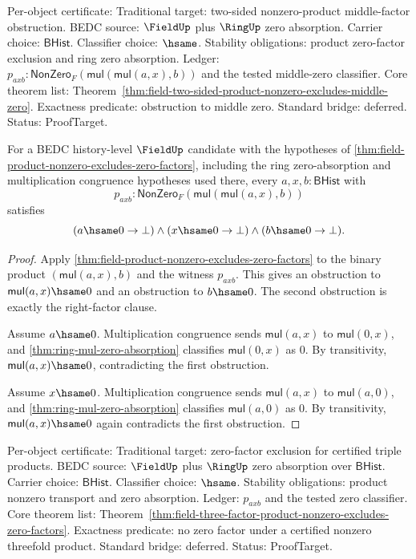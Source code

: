 Per-object certificate: Traditional target: two-sided nonzero-product
middle-factor obstruction. BEDC source: $\FieldUp$ plus $\RingUp$ zero
absorption. Carrier choice: $\mathsf{BHist}$. Classifier choice: $\hsame$.
Stability obligations: product zero-factor exclusion and ring zero
absorption. Ledger:
$p_{axb}:\mathsf{NonZero}_F(\mathsf{mul}(\mathsf{mul}(a,x),b))$ and the
tested middle-zero classifier. Core theorem list:
Theorem~\ref{thm:field-two-sided-product-nonzero-excludes-middle-zero}.
Exactness predicate: obstruction to middle zero. Standard bridge: deferred.
Status: ProofTarget.

\begin{theorem}
\label{thm:field-three-factor-product-nonzero-excludes-zero-factors}
For a BEDC history-level $\FieldUp$ candidate with the hypotheses of
\autoref{thm:field-product-nonzero-excludes-zero-factors}, including the
ring zero-absorption and multiplication congruence hypotheses used there,
every $a,x,b:\mathsf{BHist}$ with
$$
p_{axb}:\mathsf{NonZero}_F(\mathsf{mul}(\mathsf{mul}(a,x),b))
$$
satisfies
$$
(a\hsame0\to\bot)\wedge(x\hsame0\to\bot)\wedge(b\hsame0\to\bot).
$$
\end{theorem}
\begin{proof}
Apply \autoref{thm:field-product-nonzero-excludes-zero-factors} to the
binary product $(\mathsf{mul}(a,x),b)$ and the witness $p_{axb}$. This gives
an obstruction to $\mathsf{mul}(a,x)\hsame0$ and an obstruction to
$b\hsame0$. The second obstruction is exactly the right-factor clause.

Assume $a\hsame0$. Multiplication congruence sends $\mathsf{mul}(a,x)$ to
$\mathsf{mul}(0,x)$, and \autoref{thm:ring-mul-zero-absorption} classifies
$\mathsf{mul}(0,x)$ as $0$. By transitivity, $\mathsf{mul}(a,x)\hsame0$,
contradicting the first obstruction.

Assume $x\hsame0$. Multiplication congruence sends $\mathsf{mul}(a,x)$ to
$\mathsf{mul}(a,0)$, and \autoref{thm:ring-mul-zero-absorption} classifies
$\mathsf{mul}(a,0)$ as $0$. By transitivity, $\mathsf{mul}(a,x)\hsame0$
again contradicts the first obstruction.
\end{proof}

Per-object certificate: Traditional target: zero-factor exclusion for
certified triple products. BEDC source: $\FieldUp$ plus $\RingUp$ zero
absorption over $\mathsf{BHist}$. Carrier choice: $\mathsf{BHist}$.
Classifier choice: $\hsame$. Stability obligations: product nonzero transport
and zero absorption. Ledger: $p_{axb}$ and the tested zero classifier. Core
theorem list:
Theorem~\ref{thm:field-three-factor-product-nonzero-excludes-zero-factors}.
Exactness predicate: no zero factor under a certified nonzero threefold
product. Standard bridge: deferred. Status: ProofTarget.

